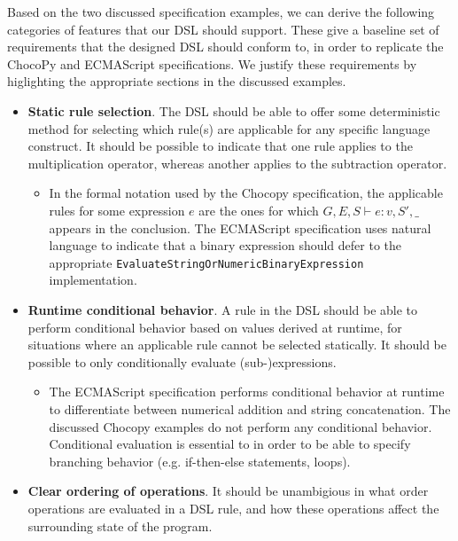 Based on the two discussed specification examples, we can derive the following categories of features that our \ac{DSL} should support. These give a baseline set of requirements that the designed \ac{DSL} should conform to, in order to replicate the ChocoPy and ECMAScript specifications. We justify these requirements by higlighting the appropriate sections in the discussed examples.

\begin{itemize}
  \item \textbf{Static rule selection}. The \ac{DSL} should be able to offer some deterministic method for selecting which rule(s) are applicable for any specific language construct. It should be possible to indicate that one rule applies to the multiplication operator, whereas another applies to the subtraction operator.
  \begin{itemize}
    \item In the formal notation used by the Chocopy specification, the applicable rules for some expression $ e $ are the ones for which $ G, E, S \vdash e : v, S', \_ $ appears in the conclusion. The ECMAScript specification uses natural language to indicate that a binary expression should defer to the appropriate \texttt{Evaluate\hspace{0pt}String\hspace{0pt}Or\hspace{0pt}Numeric\hspace{0pt}Binary\hspace{0pt}Expression} implementation.
  \end{itemize}
  \item \textbf{Runtime conditional behavior}. A rule in the \ac{DSL} should be able to perform conditional behavior based on values derived at runtime, for situations where an applicable rule cannot be selected statically. It should be possible to only conditionally evaluate (sub-)expressions.
  \begin{itemize}
    \item The ECMAScript specification performs conditional behavior at runtime to differentiate between numerical addition and string concatenation. The discussed Chocopy examples do not perform any conditional behavior. Conditional evaluation is essential to in order to be able to specify branching behavior (e.g. if-then-else statements, loops).
  \end{itemize}
  \item \textbf{Clear ordering of operations}. It should be unambigious in what order operations are evaluated in a \ac{DSL} rule, and how these operations affect the surrounding state of the program.

\end{itemize}
